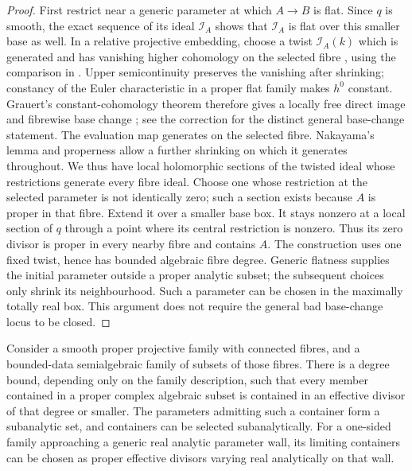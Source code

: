 \begin{proof}
First restrict near a generic parameter at which $A\to B$ is flat. Since $q$ is smooth, the exact sequence of its ideal $\mathcal{I}_A$ shows that $\mathcal{I}_A$ is flat over this smaller base as well. In a relative projective embedding, choose a twist $\mathcal{I}_A(k)$ which is generated and has vanishing higher cohomology on the selected fibre \cite[Tag~\href{https://stacks.math.columbia.edu/tag/0B5T}{0B5T}]{Stacks}, using the comparison in \cite[Theorems~1--3]{Serre1956}. Upper semicontinuity preserves the vanishing after shrinking; constancy of the Euler characteristic in a proper flat family makes $h^0$ constant. Grauert's constant-cohomology theorem therefore gives a locally free direct image and fibrewise base change \cite[\S7, S\"atze~3, 5 and~6]{Grauert1960}; see the correction \cite[p.~36]{Grauert1963} for the distinct general base-change statement. The evaluation map generates on the selected fibre. Nakayama's lemma and properness allow a further shrinking on which it generates throughout. We thus have local holomorphic sections of the twisted ideal whose restrictions generate every fibre ideal. Choose one whose restriction at the selected parameter is not identically zero; such a section exists because $A$ is proper in that fibre. Extend it over a smaller base box. It stays nonzero at a local section of $q$ through a point where its central restriction is nonzero. Thus its zero divisor is proper in every nearby fibre and contains $A$. The construction uses one fixed twist, hence has bounded algebraic fibre degree. Generic flatness supplies the initial parameter outside a proper analytic subset; the subsequent choices only shrink its neighbourhood. Such a parameter can be chosen in the maximally totally real box. This argument does not require the general bad base-change locus to be closed.
\end{proof}

\begin{lemma}\label{lem:holes-bounded-containers}
Consider a smooth proper projective family with connected fibres, and a bounded-data semialgebraic family of subsets of those fibres. There is a degree bound, depending only on the family description, such that every member contained in a proper complex algebraic subset is contained in an effective divisor of that degree or smaller. The parameters admitting such a container form a subanalytic set, and containers can be selected subanalytically. For a one-sided family approaching a generic real analytic parameter wall, its limiting containers can be chosen as proper effective divisors varying real analytically on that wall.
\end{lemma}

